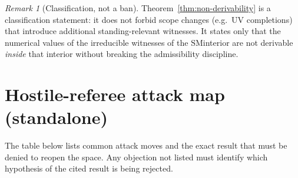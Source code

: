 \documentclass[11pt]{article}
\theoremstyle{remark}
\newtheorem{remark}[definition]{Remark}
\newcommand{\SM}{\ensuremath{\mathrm{SM}}}
\begin{document}
\begin{remark}[Classification, not a ban]\label{rem:nonfund-class}
Theorem~\ref{thm:non-derivability} is a classification statement: it does not forbid scope changes (e.g.\ UV
completions) that introduce additional standing-relevant witnesses. It states only that the numerical values
of the irreducible witnesses of the \SM interior are not derivable \emph{inside} that interior without breaking
the admissibility discipline.
\end{remark}

\section{Hostile-referee attack map (standalone)}

The table below lists common attack moves and the exact result that must be denied to reopen the space.
Any objection not listed must identify which hypothesis of the cited result is being rejected.
\end{document}
